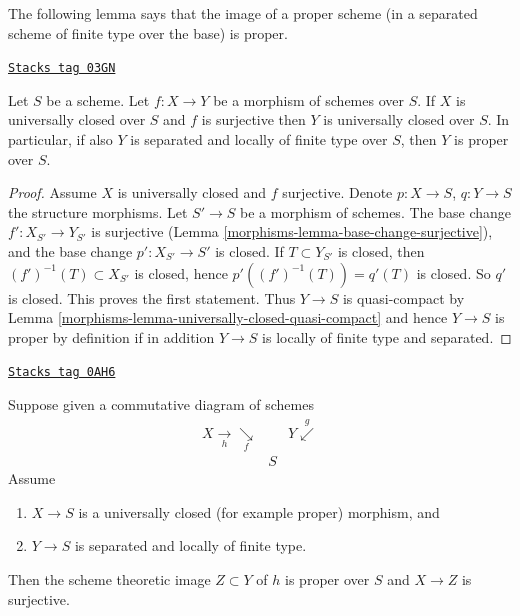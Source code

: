 The following lemma says that the image of a proper scheme (in a separated
scheme of finite type over the base) is proper.

\begin{lemma}
\label{morphisms-lemma-image-proper-is-proper}
\href{https://stacks.math.columbia.edu/tag/03GN}{\texttt{Stacks tag 03GN}}

Let $S$ be a scheme. Let $f : X \to Y$ be a morphism of schemes over $S$.
If $X$ is universally closed over $S$ and $f$ is surjective then
$Y$ is universally closed over $S$. In particular, if also $Y$ is
separated and locally of finite type over $S$, then $Y$ is proper over $S$.
\end{lemma}

\begin{proof}

Assume $X$ is universally closed and $f$ surjective.
Denote $p : X \to S$, $q : Y \to S$ the structure morphisms.
Let $S' \to S$ be a morphism of schemes. The base change
$f' : X_{S'} \to Y_{S'}$ is surjective
(Lemma \ref{morphisms-lemma-base-change-surjective}), and the base
change $p' : X_{S'} \to S'$ is closed.
If $T \subset Y_{S'}$ is closed, then $(f')^{-1}(T) \subset X_{S'}$
is closed, hence $p'((f')^{-1}(T)) = q'(T)$ is closed.
So $q'$ is closed. This proves the first statement.
Thus $Y \to S$ is quasi-compact by
Lemma \ref{morphisms-lemma-universally-closed-quasi-compact}
and hence $Y \to S$ is proper by definition
if in addition $Y \to S$ is locally of finite type and separated.
\end{proof}

\begin{lemma}
\label{morphisms-lemma-scheme-theoretic-image-is-proper}
\href{https://stacks.math.columbia.edu/tag/0AH6}{\texttt{Stacks tag 0AH6}}

Suppose given a commutative diagram of schemes
$$
\begin{array}{ccc}X \underset{h}{\longrightarrow}\underset{f}{\searrow} &  & Y \overset{g}{\swarrow} \\  & S & \end{array}
$$
Assume
\begin{enumerate}
\item $X \to S$ is a universally closed (for example proper) morphism, and
\item $Y \to S$ is separated and locally of finite type.
\end{enumerate}
Then the scheme theoretic image $Z \subset Y$ of $h$
is proper over $S$ and $X \to Z$ is surjective.
\end{lemma}

